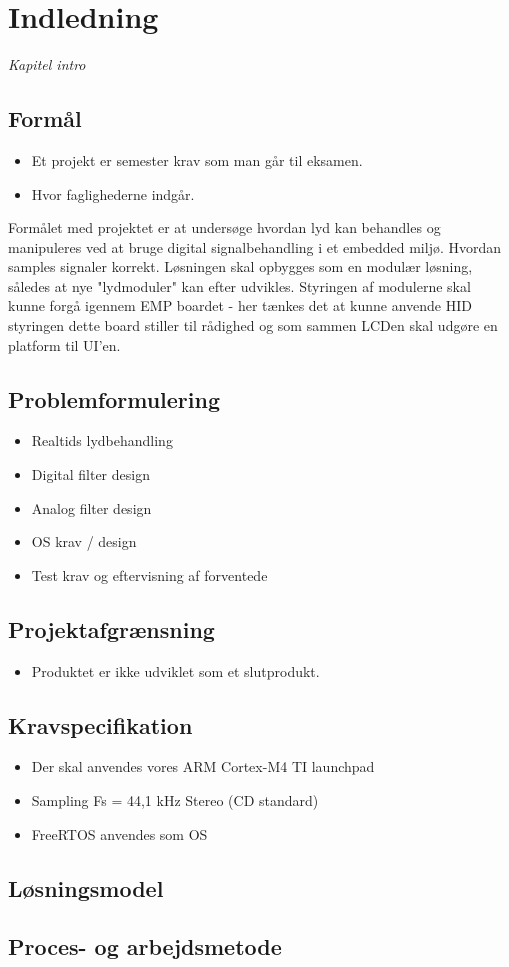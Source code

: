 \chapter{Indledning}
\vspace*{0.5 cm}
\emph{Kapitel intro}

\section{Formål}
\begin{itemize}
	\item Et projekt er semester krav som man går til eksamen.
	\item Hvor faglighederne indgår.
\end{itemize}

Formålet med projektet er at undersøge hvordan lyd kan behandles og manipuleres ved at bruge digital signalbehandling i et embedded miljø.
Hvordan samples signaler korrekt.
Løsningen skal opbygges som en modulær løsning, således at nye "lydmoduler" kan efter udvikles.
Styringen af modulerne skal kunne forgå igennem EMP boardet - her tænkes det at kunne anvende HID styringen dette board stiller til rådighed og som sammen LCDen skal udgøre en platform til UI'en. 


\section{Problemformulering}


\begin{itemize}
	\item Realtids lydbehandling 
	\item Digital filter design
	\item Analog filter design
	\item OS krav / design
	\item Test krav og eftervisning af forventede
\end{itemize}

\section{Projektafgrænsning}
\begin{itemize}
	\item Produktet er ikke udviklet som et slutprodukt.
\end{itemize}

\section{Kravspecifikation} 
\begin{itemize}
	\item Der skal anvendes vores ARM Cortex-M4 TI launchpad 
	\item Sampling Fs = 44,1 kHz Stereo (CD standard)
	\item FreeRTOS anvendes som OS	 
\end{itemize}

\section{Løsningsmodel}

\section{Proces- og arbejdsmetode}
